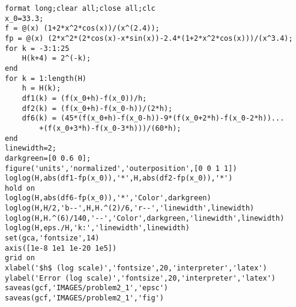 \begin{solution}
\begin{verbatim}
format long;clear all;close all;clc
x_0=33.3;
f = @(x) (1+2*x^2*cos(x))/(x^(2.4));
fp = @(x) (2*x^2*(2*cos(x)-x*sin(x))-2.4*(1+2*x^2*cos(x)))/(x^3.4);
for k = -3:1:25
    H(k+4) = 2^(-k);
end
for k = 1:length(H)
    h = H(k);
    df1(k) = (f(x_0+h)-f(x_0))/h;
    df2(k) = (f(x_0+h)-f(x_0-h))/(2*h);
    df6(k) = (45*(f(x_0+h)-f(x_0-h))-9*(f(x_0+2*h)-f(x_0-2*h))...
        +(f(x_0+3*h)-f(x_0-3*h)))/(60*h);
end
linewidth=2;
darkgreen=[0 0.6 0];
figure('units','normalized','outerposition',[0 0 1 1])
loglog(H,abs(df1-fp(x_0)),'*',H,abs(df2-fp(x_0)),'*')
hold on
loglog(H,abs(df6-fp(x_0)),'*','Color',darkgreen)
loglog(H,H/2,'b--',H,H.^(2)/6,'r--','linewidth',linewidth)
loglog(H,H.^(6)/140,'--','Color',darkgreen,'linewidth',linewidth)
loglog(H,eps./H,'k:','linewidth',linewidth)
set(gca,'fontsize',14)
axis([1e-8 1e1 1e-20 1e5])
grid on
xlabel('$h$ (log scale)','fontsize',20,'interpreter','latex')
ylabel('Error (log scale)','fontsize',20,'interpreter','latex')
saveas(gcf,'IMAGES/problem2_1','epsc')
saveas(gcf,'IMAGES/problem2_1','fig')
\end{verbatim}
\end{solution}